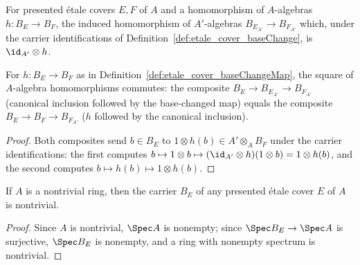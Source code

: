\begin{definition}
  \label{def:etale_cover_baseChangeMap}
  \leanok
  For presented \'etale covers \(E, F\) of \(A\) and a homomorphism of \(A\)-algebras
  \(h \colon B_E \to B_F\), the induced homomorphism of \(A'\)-algebras \(B_{E_{A'}} \to
  B_{F_{A'}}\) which, under the carrier identifications of
  Definition~\ref{def:etale_cover_baseChange}, is \(\id_{A'} \otimes h\).
\end{definition}

\begin{lemma}
  \label{lem:etale_cover_baseChangeMap_comp_baseChangeInclude}
  \leanok
  For \(h \colon B_E \to B_F\) as in Definition~\ref{def:etale_cover_baseChangeMap}, the square
  of \(A\)-algebra homomorphisms commutes: the composite \(B_E \to B_{E_{A'}} \to B_{F_{A'}}\)
  (canonical inclusion followed by the base-changed map) equals the composite
  \(B_E \to B_F \to B_{F_{A'}}\) (\(h\) followed by the canonical inclusion).
\end{lemma}
\begin{proof}
  \leanok
  Both composites send \(b \in B_E\) to \(1 \otimes h(b) \in A' \otimes_A B_F\) under the
  carrier identifications: the first computes \(b \mapsto 1 \otimes b \mapsto
  (\id_{A'}\otimes h)(1 \otimes b) = 1 \otimes h(b)\), and the second computes
  \(b \mapsto h(b) \mapsto 1 \otimes h(b)\).
\end{proof}

\begin{lemma}
  \label{lem:etale_cover_nontrivial_carrier}
  \leanok
  If \(A\) is a nontrivial ring, then the carrier \(B_E\) of any presented \'etale cover \(E\)
  of \(A\) is nontrivial.
\end{lemma}
\begin{proof}
  \leanok
  Since \(A\) is nontrivial, \(\Spec A\) is nonempty; since \(\Spec B_E \to \Spec A\) is
  surjective, \(\Spec B_E\) is nonempty, and a ring with nonempty spectrum is nontrivial.
\end{proof}


